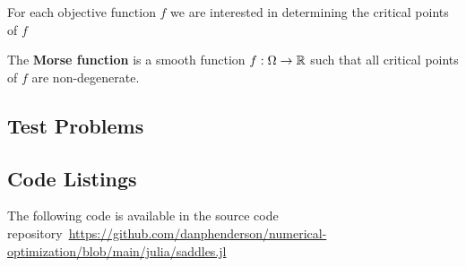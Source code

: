 \documentclass[10pt]{article}
\begin{document}
    \begin{remark}
        For each objective function $f$ we are interested in determining the
        critical points of $f$ 
    \end{remark}

    \begin{remark}
        The \textbf{Morse function} is a smooth function $f : \Omega \rightarrow \mathbb{R}$ such that
        all critical points of $f$ are non-degenerate.
    \end{remark}


\subsection{Test Problems}



\subsection{Code Listings}

The following code is available in the source code 
repository~\hyperlink{repository}{https://github.com/danphenderson/numerical-optimization/blob/main/julia/saddles.jl}
\lstset{basicstyle=\ttfamily, columns=fullflexible, keepspaces=true, breaklines=true}
\end{document}
